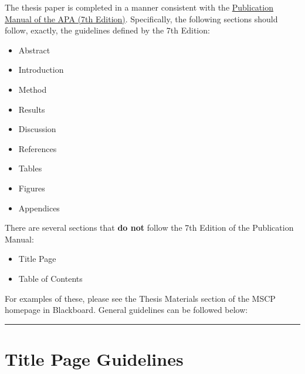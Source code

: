 \documentclass[openany]{book}
\providecommand{\tightlist}{%
  \setlength{\itemsep}{0pt}\setlength{\parskip}{0pt}}
\begin{document}
The thesis paper is completed in a manner consistent with the \href{https://www.amazon.com/s?k=apa+publication+manual+7th+edition\&crid=7T10VJ2PYQZH\&sprefix=apa+pu\%2Caps\%2C261\&ref=nb_sb_ss_i_1_6}{Publication Manual of the APA (7th Edition)}. Specifically, the following sections should follow, exactly, the guidelines defined by the 7th Edition:

\begin{itemize}
\tightlist
\item
  Abstract
\item
  Introduction
\item
  Method
\item
  Results
\item
  Discussion
\item
  References
\item
  Tables
\item
  Figures
\item
  Appendices
\end{itemize}

There are several sections that \textbf{do not} follow the 7th Edition of the Publication Manual:

\begin{itemize}
\tightlist
\item
  Title Page
\item
  Table of Contents
\end{itemize}

For examples of these, please see the Thesis Materials section of the MSCP homepage in Blackboard. General guidelines can be followed below:

\begin{center}\rule{0.5\linewidth}{0.5pt}\end{center}

\hypertarget{title-page-guidelines}{%
\section{Title Page Guidelines}\label{title-page-guidelines}}
\end{document}
